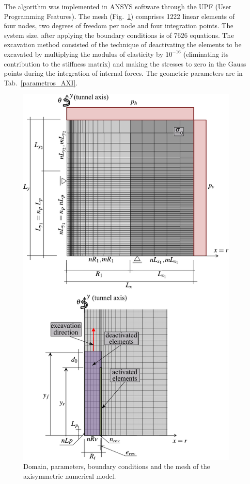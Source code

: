 \documentclass[Journal,letterpaper]{ascelike-new}
\begin{document}
The algorithm was implemented in ANSYS software through the UPF (User Programming Features). The mesh (Fig.~\ref{malhaAXI}) comprises 1222 linear elements of four nodes, two degrees of freedom per node and four integration points. The system size, after applying the boundary conditions is of 7626 equations. The excavation method consisted of the technique of deactivating the elements to be excavated by multiplying the modulus of elasticity by $10^{-16}$ (eliminating its contribution to the stiffness matrix) and making the stresses to zero in the Gauss points during the integration of internal forces. The geometric parameters are in Tab.~\ref{parametros_AXI}.

\begin{figure}
	\centering
	\includegraphics[scale = 1.0]{FIG4.pdf}
	\caption{\label{malhaAXI}Domain, parameters, boundary conditions and the mesh of the axisymmetric numerical model.}
\end{figure}
\end{document}
